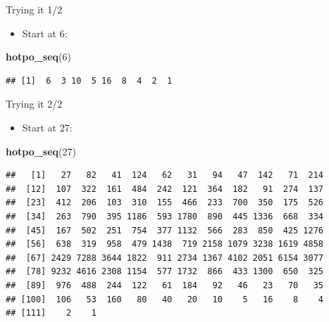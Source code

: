 \documentclass[ignorenonframetext,]{beamer}
\newenvironment{Shaded}{\begin{snugshade}}{\end{snugshade}}
\newcommand{\DecValTok}[1]{\textcolor[rgb]{0.00,0.00,0.81}{#1}}
\newcommand{\KeywordTok}[1]{\textcolor[rgb]{0.13,0.29,0.53}{\textbf{#1}}}
\newcommand{\NormalTok}[1]{#1}
\providecommand{\tightlist}{%
  \setlength{\itemsep}{0pt}\setlength{\parskip}{0pt}}
\begin{document}
\begin{frame}[fragile]{Trying it 1/2}
\protect\hypertarget{trying-it-12}{}

\begin{itemize}
\tightlist
\item
  Start at 6:
\end{itemize}

\begin{Shaded}
\begin{Highlighting}[]
\KeywordTok{hotpo_seq}\NormalTok{(}\DecValTok{6}\NormalTok{)}
\end{Highlighting}
\end{Shaded}

\begin{verbatim}
## [1]  6  3 10  5 16  8  4  2  1
\end{verbatim}

\end{frame}

\begin{frame}[fragile]{Trying it 2/2}
\protect\hypertarget{trying-it-22}{}

\begin{itemize}
\tightlist
\item
  Start at 27:
\end{itemize}

\footnotesize

\begin{Shaded}
\begin{Highlighting}[]
\KeywordTok{hotpo_seq}\NormalTok{(}\DecValTok{27}\NormalTok{)}
\end{Highlighting}
\end{Shaded}

\begin{verbatim}
##   [1]   27   82   41  124   62   31   94   47  142   71  214
##  [12]  107  322  161  484  242  121  364  182   91  274  137
##  [23]  412  206  103  310  155  466  233  700  350  175  526
##  [34]  263  790  395 1186  593 1780  890  445 1336  668  334
##  [45]  167  502  251  754  377 1132  566  283  850  425 1276
##  [56]  638  319  958  479 1438  719 2158 1079 3238 1619 4858
##  [67] 2429 7288 3644 1822  911 2734 1367 4102 2051 6154 3077
##  [78] 9232 4616 2308 1154  577 1732  866  433 1300  650  325
##  [89]  976  488  244  122   61  184   92   46   23   70   35
## [100]  106   53  160   80   40   20   10    5   16    8    4
## [111]    2    1
\end{verbatim}

\normalsize

\end{frame}
\end{document}
